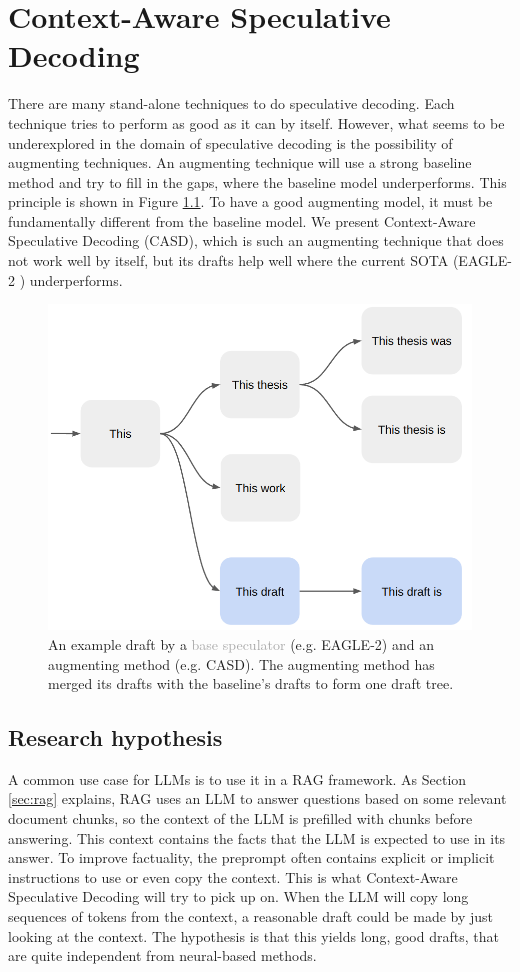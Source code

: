 
\chapter{Context-Aware Speculative Decoding}
\label{sec:casd}

There are many stand-alone techniques to do speculative decoding. Each technique tries to perform as good as it can by itself. However, what seems to be underexplored in the domain of speculative decoding is the possibility of augmenting techniques. An augmenting technique will use a strong baseline method and try to fill in the gaps, where the baseline model underperforms. This principle is shown in Figure \ref{fig:spec_dec_casd_augment}. To have a good augmenting model, it must be fundamentally different from the baseline model. We present Context-Aware Speculative Decoding (CASD), which is such an augmenting technique that does not work well by itself, but its drafts help well where the current SOTA (EAGLE-2 \cite{li2024eagle}) underperforms.

\begin{figure}[h]
	\centering
	\includegraphics[width=0.7\linewidth]{fig/spec_dec_casd_augment.png}
	\caption{An example draft by a \textcolor{darkgray}{base speculator} (e.g. EAGLE-2) and an \textcolor{blue-ish}{augmenting method} (e.g. CASD). The augmenting method has merged its drafts with the baseline's drafts to form one draft tree.}
	\label{fig:spec_dec_casd_augment}
\end{figure}

\section{Research hypothesis}
A common use case for LLMs is to use it in a RAG framework. As Section \ref{sec:rag} explains, RAG uses an LLM to answer questions based on some relevant document chunks, so the context of the LLM is prefilled with chunks before answering. This context contains the facts that the LLM is expected to use in its answer. To improve factuality, the preprompt often contains explicit or implicit instructions to use or even copy the context. This is what Context-Aware Speculative Decoding will try to pick up on. When the LLM will copy long sequences of tokens from the context, a reasonable draft could be made by just looking at the context. The hypothesis is that this yields long, good drafts, that are quite independent from neural-based methods.

